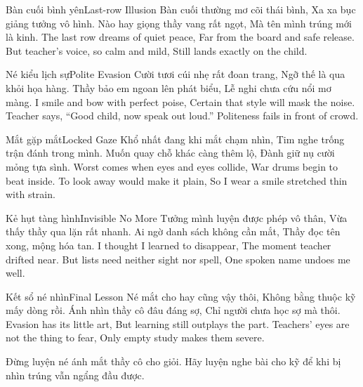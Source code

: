 \begin{tutuyetbox}{Bàn cuối bình yên}{Last-row Illusion}
Bàn cuối thường mơ cõi thái bình,
Xa xa bục giảng tưởng vô hình.
Nào hay giọng thầy vang rất ngọt,
Mà tên mình trúng mới là kinh.
\tcblower
The last row dreams of quiet peace,
Far from the board and safe release.
But teacher's voice, so calm and mild,
Still lands exactly on the child.
\end{tutuyetbox}

\begin{tutuyetbox}{Né kiểu lịch sự}{Polite Evasion}
Cười tươi cúi nhẹ rất đoan trang,
Ngỡ thế là qua khỏi họa hàng.
Thầy bảo em ngoan lên phát biểu,
Lễ nghi chưa cứu nổi mơ màng.
\tcblower
I smile and bow with perfect poise,
Certain that style will mask the noise.
Teacher says, “Good child, now speak out loud.”
Politeness fails in front of crowd.
\end{tutuyetbox}

\begin{tutuyetbox}{Mắt gặp mắt}{Locked Gaze}
Khổ nhất đang khi mắt chạm nhìn,
Tim nghe trống trận đánh trong mình.
Muốn quay chỗ khác càng thêm lộ,
Đành giữ nụ cười mỏng tựa sình.
\tcblower
Worst comes when eyes and eyes collide,
War drums begin to beat inside.
To look away would make it plain,
So I wear a smile stretched thin with strain.
\end{tutuyetbox}

\begin{tutuyetbox}{Kẻ hụt tàng hình}{Invisible No More}
Tưởng mình luyện được phép vô thân,
Vừa thấy thầy qua lặn rất nhanh.
Ai ngờ danh sách không cần mắt,
Thầy đọc tên xong, mộng hóa tan.
\tcblower
I thought I learned to disappear,
The moment teacher drifted near.
But lists need neither sight nor spell,
One spoken name undoes me well.
\end{tutuyetbox}

\begin{tutuyetbox}{Kết sổ né nhìn}{Final Lesson}
Né mắt cho hay cũng vậy thôi,
Không bằng thuộc kỹ mấy dòng rồi.
Ánh nhìn thầy cô đâu đáng sợ,
Chỉ người chưa học sợ mà thôi.
\tcblower
Evasion has its little art,
But learning still outplays the part.
Teachers' eyes are not the thing to fear,
Only empty study makes them severe.
\end{tutuyetbox}

\begin{ghichu}
Đừng luyện né ánh mắt thầy cô cho giỏi. Hãy luyện nghe bài cho kỹ để khi bị nhìn trúng vẫn ngẩng đầu được.
\end{ghichu}
